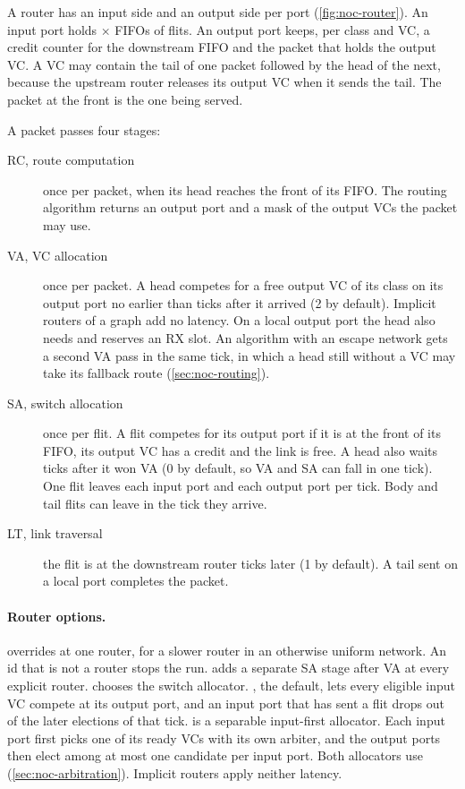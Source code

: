 A router has an input side and an output side per port (\cref{fig:noc-router}). An input port
holds  $\times$  FIFOs of  flits. An output
port keeps, per class and VC, a credit counter for the downstream FIFO and the packet that holds
the output VC. A VC may contain the tail of one packet followed by the head of the next, because
the upstream router releases its output VC when it sends the tail. The packet at the front is the
one being served.

A packet passes four stages:

\begin{description}
\item[RC, route computation] once per packet, when its head reaches the front of its FIFO. The
  routing algorithm returns an output port and a mask of the output VCs the packet may use.
\item[VA, VC allocation] once per packet. A head competes for a free output VC of its class on
  its output port no earlier than  ticks after it arrived (2 by default).
  Implicit routers of a  graph add no latency. On a local output port the head also
  needs and reserves an RX slot. An algorithm with an escape network gets a second VA pass in the
  same tick, in which a head still without a VC may take its fallback route
  (\cref{sec:noc-routing}).
\item[SA, switch allocation] once per flit. A flit competes for its output port if it is at the
  front of its FIFO, its output VC has a credit and the link is free. A head also waits
   ticks after it won VA (0 by default, so VA and SA can fall in one tick).
  One flit leaves each input port and each output port per tick. Body and tail flits can leave
  in the tick they arrive.
\item[LT, link traversal] the flit is at the downstream router  ticks later
  (1 by default). A tail sent on a local port completes the packet.
\end{description}

\paragraph{Router options.}  overrides
 at one router, for a slower router in an otherwise uniform network. An id
that is not a router stops the run.  adds a separate SA stage after VA at
every explicit router.  chooses the switch allocator. , the
default, lets every eligible input VC compete at its output port, and an input port that has sent
a flit drops out of the later elections of that tick.  is a separable
input-first allocator. Each input port first picks one of its ready VCs with its own arbiter, and
the output ports then elect among at most one candidate per input port. Both allocators use
 (\cref{sec:noc-arbitration}). Implicit routers apply neither latency.

